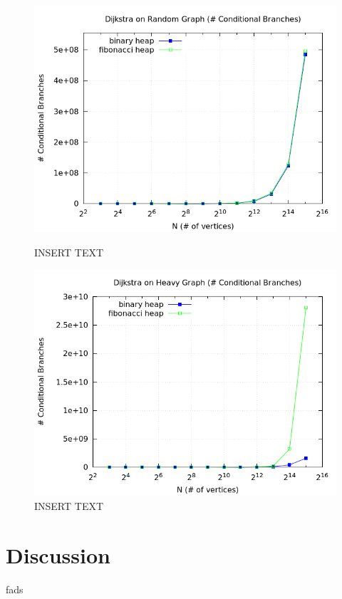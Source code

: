 \documentclass[a4paper,oneside,article,11pt]{memoir}
\begin{document}
\begin{figure}[H]
\centering
\begin{minipage}{0.48\columnwidth}
  \centering
  \includegraphics[width=\linewidth]{../res/dijkstra/d_random_br.png}%
  \caption{INSERT TEXT}
  \label{fig:delmin_2_random_branch}
\end{minipage}%
\hfill
\begin{minipage}{0.48\columnwidth}
  \centering
  \includegraphics[width=\linewidth]{../res/dijkstra/d_heavy_br.png}%
  \caption{INSERT TEXT}
  \label{fig:delmin_2_worst_branch}
\end{minipage}
\end{figure}

\section{Discussion}
fads


\end{document}
